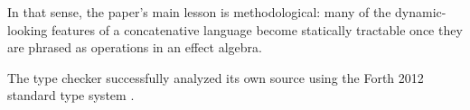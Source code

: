 \documentclass[11pt]{article}
\begin{document}
In that sense, the paper's main lesson is methodological: many of the dynamic-looking features of a concatenative language become statically tractable once they are phrased as operations in an effect algebra.

The type checker successfully analyzed its own source using the Forth 2012 standard type system \cite{forth2012standard}.



\end{document}
